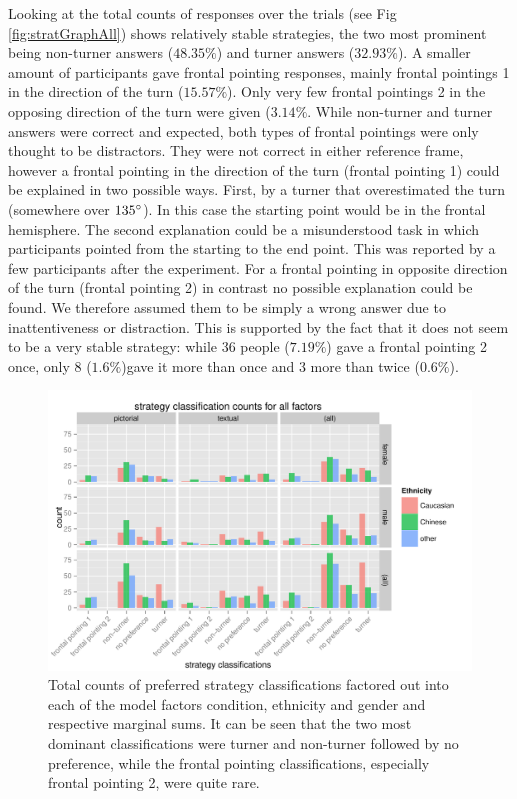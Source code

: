 \documentclass{frontiersSCNS} %
\begin{document}
Looking at the total counts of responses over the trials (see Fig \ref{fig:stratGraphAll}) shows relatively stable strategies, the two most prominent being non-turner answers ($48.35\%$) and turner answers ($32.93\%$). A smaller amount of participants gave frontal pointing responses, mainly frontal pointings 1  in the direction of the turn ($15.57\%$). Only very few frontal pointings 2 in the opposing direction of the turn were given ($3.14\%$. 
While non-turner and turner answers were correct and expected, both types of frontal pointings were only thought to be distractors. They were not correct in either reference frame, however a frontal pointing in the direction of the turn (frontal pointing 1) could be explained in two possible ways. First, by a turner that overestimated the turn (somewhere over $135\degree$). In this case the starting point would be in the frontal hemisphere. The second explanation could be a misunderstood task in which participants pointed from the starting to the end point. This was reported by a few participants after the experiment. 
For a frontal pointing in opposite direction of the turn (frontal pointing 2) in contrast no possible explanation could be found. We therefore assumed them to be simply a wrong answer due to inattentiveness or distraction. This is supported by the fact that it does not seem to be a very stable strategy: while 36 people ($7.19\%$) gave a frontal pointing 2 once, only 8  ($1.6\%$)gave it more than once and 3 more than twice ($0.6\%$).\\


\begin{figure}[h!]
  \centering
    \includegraphics[width=\textwidth]{figures/histOverview.pdf}
   \caption{ \footnotesize Total counts of preferred strategy classifications factored out into each of the model factors condition, ethnicity and gender and respective marginal sums. It can be seen that the two most dominant classifications were turner and non-turner followed by no preference, while the frontal pointing classifications, especially frontal pointing 2, were quite rare.}
   \label{fig:HistOverview}
\end{figure}
\end{document}
